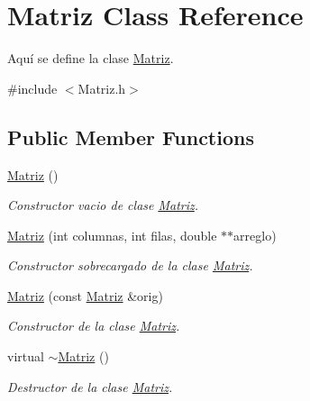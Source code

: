 \hypertarget{class_matriz}{}\section{Matriz Class Reference}
\label{class_matriz}


Aquí se define la clase \hyperlink{class_matriz}{Matriz}.  




{\ttfamily \#include $<$Matriz.\+h$>$}

\subsection*{Public Member Functions}
\begin{DoxyCompactItemize}
\item 
\hypertarget{class_matriz_a7de756301bddbc4b0b5d2a0f2b1fc695}{}\label{class_matriz_a7de756301bddbc4b0b5d2a0f2b1fc695} 
\hyperlink{class_matriz_a7de756301bddbc4b0b5d2a0f2b1fc695}{Matriz} ()
\begin{DoxyCompactList}\small\item\em Constructor vacio de clase \hyperlink{class_matriz}{Matriz}. \end{DoxyCompactList}\item 
\hyperlink{class_matriz_a559cdf7b75f2af6046a61ccf85d15091}{Matriz} (int columnas, int filas, double $\ast$$\ast$arreglo)
\begin{DoxyCompactList}\small\item\em Constructor sobrecargado de la clase \hyperlink{class_matriz}{Matriz}. \end{DoxyCompactList}\item 
\hyperlink{class_matriz_a2e92dacecb0b51f061fccc56bd89ee4a}{Matriz} (const \hyperlink{class_matriz}{Matriz} \&orig)
\begin{DoxyCompactList}\small\item\em Constructor de la clase \hyperlink{class_matriz}{Matriz}. \end{DoxyCompactList}\item 
\hypertarget{class_matriz_a2092b7a289ecec369e1da407d5839f5a}{}\label{class_matriz_a2092b7a289ecec369e1da407d5839f5a} 
virtual \hyperlink{class_matriz_a2092b7a289ecec369e1da407d5839f5a}{$\sim$\+Matriz} ()
\begin{DoxyCompactList}\small\item\em Destructor de la clase \hyperlink{class_matriz}{Matriz}. \end{DoxyCompactList}\item 
$$
\end{DoxyCompactItemize}
